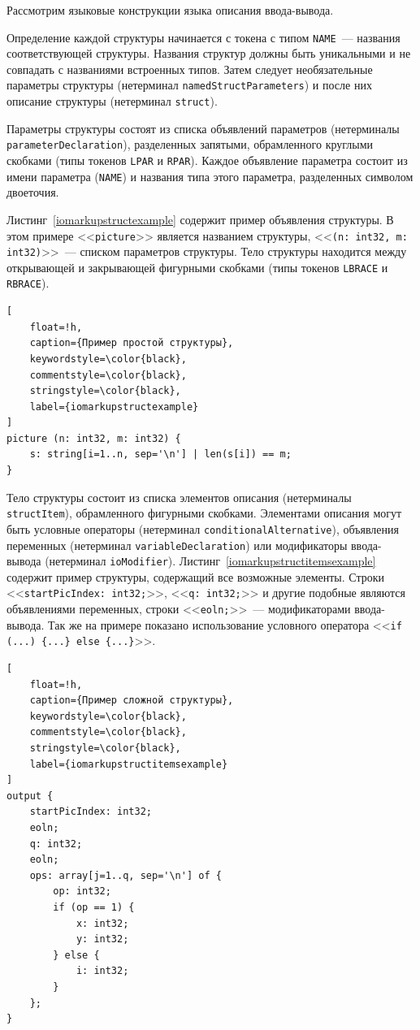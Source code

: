 \documentclass[times,specification,annotation]{style/itmo-student-thesis/itmo-student-thesis}
\begin{document}
Рассмотрим языковые конструкции языка описания ввода-вывода.

Определение каждой структуры начинается с токена с типом \texttt{NAME}~--- названия соответствующей структуры. Названия структур должны быть уникальными и не совпадать с названиями встроенных типов. Затем следует необязательные параметры структуры (нетерминал \texttt{namedStructParameters}) и после них описание структуры (нетерминал \texttt{struct}).

Параметры структуры состоят из списка объявлений параметров (нетерминалы \texttt{parameterDeclaration}), разделенных запятыми, обрамленного круглыми скобками (типы токенов \texttt{LPAR} и \texttt{RPAR}). Каждое объявление параметра состоит из имени параметра (\texttt{NAME}) и названия типа этого параметра, разделенных символом двоеточия.

Листинг~\ref{iomarkupstructexample} содержит пример объявления структуры. В этом примере <<\texttt{picture}>> является названием структуры, <<\texttt{(n: int32, m: int32)}>>~--- списком параметров структуры. Тело структуры находится между открывающей и закрывающей фигурными скобками (типы токенов \texttt{LBRACE} и \texttt{RBRACE}).

\begin{lstlisting}[
    float=!h,
    caption={Пример простой структуры},
    keywordstyle=\color{black},
    commentstyle=\color{black},
    stringstyle=\color{black},
    label={iomarkupstructexample}
]
picture (n: int32, m: int32) {
    s: string[i=1..n, sep='\n'] | len(s[i]) == m;
}
\end{lstlisting}

Тело структуры состоит из списка элементов описания (нетерминалы \texttt{structItem}), обрамленного фигурными скобками. Элементами описания могут быть условные операторы (нетерминал \texttt{conditionalAlternative}), объявления переменных (нетерминал \texttt{variableDeclaration}) или модификаторы ввода-вывода (нетерминал \texttt{ioModifier}). Листинг~\ref{iomarkupstructitemsexample} содержит пример структуры, содержащий все возможные элементы. Строки <<\texttt{startPicIndex: int32;}>>, <<\texttt{q: int32;}>> и другие подобные являются объявлениями переменных, строки <<\texttt{eoln;}>>~--- модификаторами ввода-вывода. Так же на примере показано использование условного оператора <<\texttt{if (...) \{...\} else \{...\}}>>.

\begin{lstlisting}[
    float=!h,
    caption={Пример сложной структуры},
    keywordstyle=\color{black},
    commentstyle=\color{black},
    stringstyle=\color{black},
    label={iomarkupstructitemsexample}
]
output {
    startPicIndex: int32;
    eoln;
    q: int32;
    eoln;
    ops: array[j=1..q, sep='\n'] of {
        op: int32;
        if (op == 1) {
            x: int32;
            y: int32;
        } else {
            i: int32;
        }
    };
}

\end{lstlisting}
\end{document}
